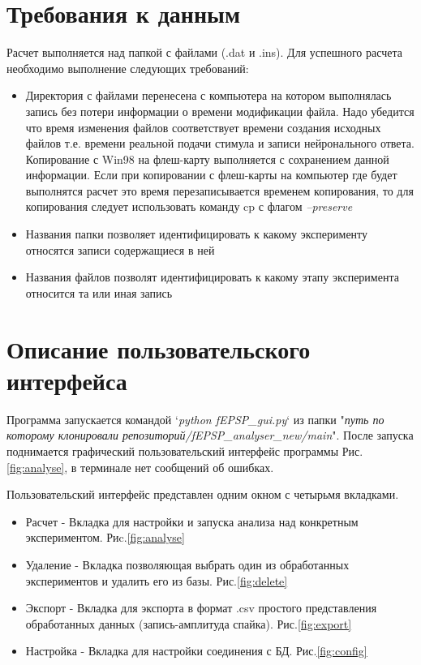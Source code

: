 \documentclass[12pt,a4paper]{report}
\begin{document}
\section{Требования к данным}
Расчет выполняется над папкой с файлами (.dat и .ins). Для успешного расчета необходимо выполнение следующих требований:
\begin{itemize}
\item Директория с файлами перенесена с компьютера на котором выполнялась запись без потери информации о времени модификации файла. Надо убедится что время изменения файлов соответствует времени создания исходных файлов т.е. времени реальной подачи стимула и записи нейронального ответа. Копирование с Win98 на флеш-карту выполняется с сохранением данной информации. Если при копировании с флеш-карты на компьютер где будет выполнятся расчет это время перезаписывается временем копирования, то для копирования следует использовать команду cp с флагом \textit{--preserve}
\item Названия папки позволяет идентифицировать к какому эксперименту относятся записи содержащиеся в ней
\item Названия файлов позволят идентифицировать к какому этапу эксперимента относится та или иная запись
\end{itemize}
\section{Описание пользовательского интерфейса}
Программа запускается командой `\emph{python fEPSP\_gui.py}` из папки "\emph{путь по которому клонировали репозиторий/fEPSP\_analyser\_new/main}".
После запуска поднимается графический пользовательский интерфейс программы Рис.\ref{fig:analyse}, в терминале нет сообщений об ошибках.

Пользовательский интерфейс представлен одним окном с четырьмя вкладками.
\begin{itemize}
\item Расчет - Вкладка для настройки и запуска анализа над конкретным экспериментом. Риc.\ref{fig:analyse}
\item Удаление - Вкладка позволяющая выбрать один из обработанных экспериментов и удалить его из базы. Рис.\ref{fig:delete}
\item Экспорт - Вкладка для экспорта в формат .csv простого представления обработанных данных (запись-амплитуда спайка). Рис.\ref{fig:export}
\item Настройка - Вкладка для настройки соединения с БД. Рис.\ref{fig:config}
\end{itemize}
\newpage
\end{document}

